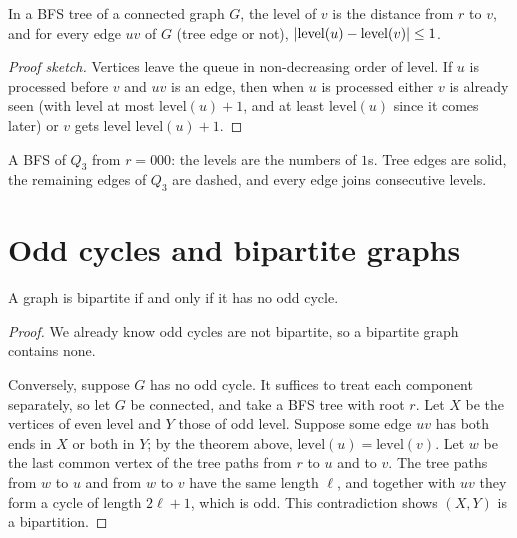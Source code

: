 \begin{theorem}
In a BFS tree of a connected graph $G$, the level of $v$ is the distance from $r$ to $v$, and for
every edge $uv$ of $G$ (tree edge or not), $\left\lvert \mathrm{level}(u) - \mathrm{level}(v) \right\rvert \le 1$.
\end{theorem}
\begin{proof}[Proof sketch]
Vertices leave the queue in non-decreasing order of level. If $u$ is processed before $v$ and
$uv$ is an edge, then when $u$ is processed either $v$ is already seen (with level at most
$\mathrm{level}(u) + 1$, and at least $\mathrm{level}(u)$ since it comes later) or $v$ gets level
$\mathrm{level}(u) + 1$.
\end{proof}

\begin{example}
A BFS of $Q_3$ from $r = 000$: the levels are the numbers of $1$s. Tree edges are solid, the
remaining edges of $Q_3$ are dashed, and every edge joins consecutive levels.
\begin{center}
\end{center}
\end{example}

\section{Odd cycles and bipartite graphs}

\begin{theorem}
A graph is bipartite if and only if it has no odd cycle.
\end{theorem}
\begin{proof}
We already know odd cycles are not bipartite, so a bipartite graph contains none.

Conversely, suppose $G$ has no odd cycle. It suffices to treat each component separately, so let
$G$ be connected, and take a BFS tree with root $r$. Let $X$ be the vertices of even level and $Y$
those of odd level. Suppose some edge $uv$ has both ends in $X$ or both in $Y$; by the theorem
above, $\mathrm{level}(u) = \mathrm{level}(v)$. Let $w$ be the last common vertex of the tree paths
from $r$ to $u$ and to $v$. The tree paths from $w$ to $u$ and from $w$ to $v$ have the same
length $\ell$, and together with $uv$ they form a cycle of length $2\ell + 1$, which is odd. This
contradiction shows $(X,Y)$ is a bipartition.
\end{proof}

